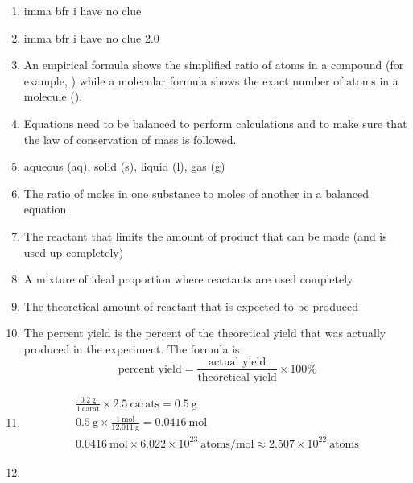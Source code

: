 \documentclass[a4paper, 12pt]{article}
\newcommand{\lab}[1]{\: \text{#1}}
\begin{document}
\begin{enumerate}[label=\alph*.]
\item imma bfr i have no clue
\item imma bfr i have no clue 2.0
\item An empirical formula shows the simplified ratio of atoms in a compound (for example, ) while a molecular formula shows the exact number of atoms in a molecule (). 
\item Equations need to be balanced to perform calculations and to make sure that the law of conservation of mass is followed.
\item aqueous (aq), solid (s), liquid (l), gas (g)
\item The ratio of moles in one substance to moles of another in a balanced equation
\item The reactant that limits the amount of product that can be made (and is used up completely)
\item A mixture of ideal proportion where reactants are used completely
\item The theoretical amount of reactant that is expected to be produced
\item The percent yield is the percent of the theoretical yield that was actually produced in the experiment. The formula is 
$$ \text{percent yield} = \frac{\text{actual yield}}{\text{theoretical yield}} \times 100\% $$
\item
\begin{gather*}
\frac{0.2 \lab{g}}{1 \lab{carat}} \times 2.5 \lab{carats} = 0.5 \lab{g} \\
0.5 \lab{g} \times \frac{1 \lab{mol}}{12.011 \lab{g}} = 0.0416 \lab{mol} \\
0.0416 \lab{mol} \times 6.022 \times 10^{23} \lab{atoms/mol} \approx \boxed{2.507 \times 10^{22} \lab{atoms}}
\end{gather*}
\item


\end{enumerate}
\end{document}
